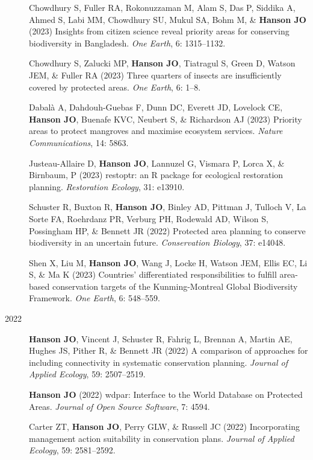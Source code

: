 \documentclass[12pt,a4paper]{article}
\begin{document}
\begin{description}
\item[] Chowdhury S, Fuller RA, Rokonuzzaman M, Alam S, Das P, Siddika A, Ahmed S, Labi MM, Chowdhury SU, Mukul SA, Bohm M, \& \textbf{Hanson JO} (2023) Insights from citizen science reveal priority areas for conserving biodiversity in Bangladesh. \textit{One Earth}, 6: 1315--1132.

\item[] Chowdhury S, Zalucki MP, \textbf{Hanson JO}, Tiatragul S, Green D, Watson JEM, \& Fuller RA (2023) Three quarters of insects are insufficiently covered by protected areas. \textit{One Earth}, 6: 1--8.

\item[] Dabalà A, Dahdouh-Guebas F, Dunn DC, Everett JD, Lovelock CE, \textbf{Hanson JO}, Buenafe KVC, Neubert S, \& Richardson AJ (2023) Priority areas to protect mangroves and maximise ecosystem services. \textit{Nature Communications}, 14: 5863.

\item[] Justeau-Allaire D, \textbf{Hanson JO}, Lannuzel G, Vismara P, Lorca X, \& Birnbaum, P (2023) restoptr: an R package for ecological restoration planning. \textit{Restoration Ecology}, 31: e13910.

\item[] Schuster R, Buxton R, \textbf{Hanson JO}, Binley AD, Pittman J, Tulloch V, La Sorte FA, Roehrdanz PR, Verburg PH, Rodewald AD, Wilson S, Possingham HP, \& Bennett JR (2022) Protected area planning to conserve biodiversity in an uncertain future. \textit{Conservation Biology}, 37: e14048.

\item[] Shen X, Liu M, \textbf{Hanson JO}, Wang J, Locke H, Watson JEM, Ellis EC, Li S, \& Ma K (2023) Countries' differentiated responsibilities to fulfill area-based conservation targets of the Kunming-Montreal Global Biodiversity Framework. \textit{One Earth}, 6: 548--559.

\item[2022] \textbf{Hanson JO}, Vincent J, Schuster R, Fahrig L, Brennan A, Martin AE, Hughes JS, Pither R, \& Bennett JR (2022) A comparison of approaches for including connectivity in systematic conservation planning. \textit{Journal of Applied Ecology}, 59: 2507--2519.

\item [] \textbf{Hanson JO} (2022) wdpar: Interface to the World Database on Protected Areas. \textit{Journal of Open Source Software}, 7: 4594.

\item [] Carter ZT, \textbf{Hanson JO}, Perry GLW, \& Russell JC (2022) Incorporating management action suitability in conservation plans. \textit{Journal of Applied Ecology}, 59: 2581--2592.


\end{description}
\end{document}
